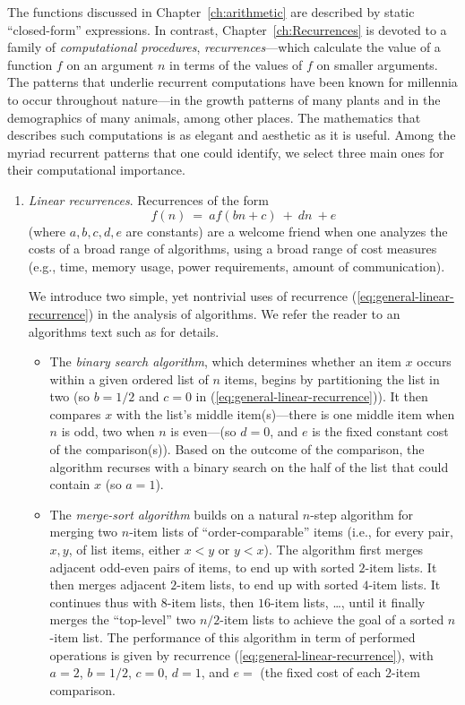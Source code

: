 The functions discussed in Chapter~\ref{ch:arithmetic} are described
by static ``closed-form'' expressions.  In contrast,
Chapter~\ref{ch:Recurrences} is devoted to a family of {\em
  computational procedures}, {\it recurrences}---which calculate the
value of a function $f$ on an argument $n$ in terms of the values of
$f$ on smaller arguments.  The patterns that underlie recurrent
computations have been known for millennia to occur throughout
nature---in the growth patterns of many plants and in the demographics
of many animals, among other places.  The mathematics that describes
such computations is as elegant and aesthetic as it is useful.  Among
the myriad recurrent patterns that one could identify, we select three
main ones for their computational importance.
\begin{enumerate}
\item
{\it Linear recurrences}.  Recurrences of the form
\begin{equation}
\label{eq:general-linear-recurrence}
f(n) \ = \ a f(bn+c) \ + \ dn \ + e
\end{equation}
(where $a, b, c, d, e$ are constants) are a welcome friend when one
analyzes the costs of a broad range of algorithms, using a broad range
of cost measures (e.g., time, memory usage, power requirements, amount
of communication).

We introduce two simple, yet nontrivial uses of recurrence
(\ref{eq:general-linear-recurrence}) in the analysis of algorithms.
We refer the reader to an algorithms text such as \cite{CLRS} for
details.
  \begin{itemize}
  \item
The {\em binary search algorithm}, which determines whether an item
$x$ occurs within a given ordered list of $n$ items, begins by
partitioning the list in two (so $b = 1/2$ and $c = 0$ in
(\ref{eq:general-linear-recurrence})).  It then compares $x$ with the
list's middle item(s)---there is one middle item when $n$ is odd, two
when $n$ is even---(so $d = 0$, and $e$ is the fixed constant cost of
the comparison(s)).  Based on the outcome of the comparison, the
algorithm recurses with a binary search on the half of the list that
could contain $x$ (so $a = 1$).

  \item
The {\em merge-sort algorithm} builds on a natural $n$-step algorithm
for merging two $n$-item lists of ``order-comparable'' items (i.e.,
for every pair, $x,y$, of list items, either $x < y$ or $y < x$).  The
algorithm first merges adjacent odd-even pairs of items, to end up
with sorted $2$-item lists.  It then merges adjacent $2$-item lists,
to end up with sorted $4$-item lists.  It continues thus with $8$-item
lists, then $16$-item lists, \ldots, until it finally merges the
``top-level'' two $n/2$-item lists to achieve the goal of a sorted
$n$-item list.  The performance of this algorithm in term of performed operations is given by
recurrence (\ref{eq:general-linear-recurrence}), with
$a=2$, $b = 1/2$, $c = 0$, $d=1$, and $e =$ (the fixed cost of
each $2$-item comparison. 
  \end{itemize}



\end{enumerate}
